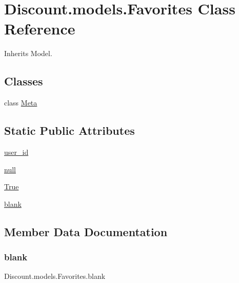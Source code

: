 \hypertarget{class_discount_1_1models_1_1_favorites}{}\section{Discount.\+models.\+Favorites Class Reference}
\label{class_discount_1_1models_1_1_favorites}


Inherits Model.

\subsection*{Classes}
\begin{DoxyCompactItemize}
\item 
class \hyperlink{class_discount_1_1models_1_1_favorites_1_1_meta}{Meta}
\end{DoxyCompactItemize}
\subsection*{Static Public Attributes}
\begin{DoxyCompactItemize}
\item 
\hyperlink{class_discount_1_1models_1_1_favorites_a83a3a5766da801ebf17fb388664052e1}{user\+\_\+id}
\item 
\hyperlink{class_discount_1_1models_1_1_favorites_af9d8f2e77d39b165d51c6355b6520607}{null}
\item 
\hyperlink{class_discount_1_1models_1_1_favorites_af69b4db536ea8fc7ae916273197a439e}{True}
\item 
\hyperlink{class_discount_1_1models_1_1_favorites_a20b79b131a376c5098133f3aff9dddd1}{blank}
\end{DoxyCompactItemize}


\subsection{Member Data Documentation}
\mbox{\label{class_discount_1_1models_1_1_favorites_a20b79b131a376c5098133f3aff9dddd1}} 
\subsubsection{\texorpdfstring{blank}{blank}}
{\footnotesize\ttfamily Discount.\+models.\+Favorites.\+blank\hspace{0.3cm}{\ttfamily [static]}}

